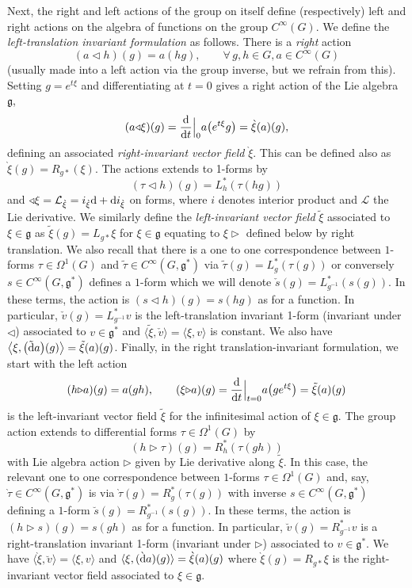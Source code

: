 \documentclass[pdftex]{sigma}
\numberwithin{equation}{section}
\newcommand{\<}{{\langle}}
\renewcommand{\>}{{\rangle}}
\newcommand{\CL}{{\mathcal{L}}}
\newcommand{\extd}{{\rm d}}
\newcommand{\la}{{\triangleright}}
\newcommand{\ra}{{\triangleleft}}
\newcommand{\cg}{{\mathfrak{g}}}
\newcommand{\tilder}{\grave}
\newcommand{\hatr}{\breve }
\newcommand{\hatl}{\check }
\begin{document}
Next, the right and left actions of the group on itself define (respectively) left and right actions on the algebra of functions on the group $C^\infty(G)$. We define the {\em left-translation invariant formulation} as follows. There is a {\em right} action
\[ (a\ra h)(g)=a(hg), \qquad\forall\, g,h\in G, a\in C^\infty(G) \]
(usually made into a left action via the group inverse, but we refrain from this). Setting $g=e^{t\xi}$ and differentiating at $t=0$ gives a right action of the Lie algebra $\cg$,
\[ (a\ra\xi)(g)=\frac{\extd}{\extd t}\Big|_0a\big(e^{t\xi}g\big)=\tilder\xi(a)(g), \]
defining an associated {\em right-invariant vector field} $\tilder\xi$. This can be defined also as $\tilder\xi(g)=R_{g*}(\xi)$. The actions extends to 1-forms by
\[ (\tau\ra h)(g)=L_h^*(\tau(hg))\]
and $\ra\xi=\CL_{\tilder\xi}=i_{\tilder\xi}\extd+\extd i_{\tilder\xi}$ on forms, where $i$ denotes interior product and $\CL$ the Lie derivative. We similarly define the {\em left-invariant vector field} $\tilde\xi$ associated to $\xi\in\cg$ as $\tilde\xi(g)=L_{g*}\xi$ for $\xi\in \cg$ equating to $\xi\la$ defined below by right translation. We also recall that there is a one to one correspondence between $1$-forms $\tau\in \Omega^1(G)$ and $\tilde{\tau}\in C^\infty(G,\mathfrak{g}^*)$ via $\tilde{\tau}(g)=L^*_{g}(\tau(g))$ or conversely $s\in C^\infty(G,\mathfrak{g}^*)$ defines a $1$-form which we will denote $\hatl{s}(g)=L^*_{g^{-1}}(s(g))$. In these terms, the action is $(s\ra h)(g)=s(hg)$ as for a function. In particular, $\hatl v(g)=L_{g^{-1}}^*v$ is the left-translation invariant 1-form (invariant under $\ra$) associated to $v\in\cg^*$ and $\<\tilde\xi,\hatl v\>=\<\xi,v\>$ is constant. We also have $\big\langle \xi,\big(\tilde\extd a\big)(g)\big\rangle=\tilde\xi(a)(g)$. Finally, in the right translation-invariant formulation, we start with the left action
\[ (h\la a)(g)=a(gh),\qquad (\xi\la a)(g)={\extd \over\extd t}\Big|_{t=0}a\big(ge^{t\xi}\big)=\tilde{\xi}(a)(g)\]
is the left-invariant vector field $\tilde\xi$ for the infinitesimal action of $\xi\in\cg$. The group action extends to differential forms $\tau\in \Omega^1(G)$ by
\[ (h\la\tau)(g)=R^*_{h}(\tau(gh))\]
with Lie algebra action $\la$ given by Lie derivative along $\tilde\xi$. In this case, the relevant one to one correspondence between $1$-forms $\tau\in \Omega^1(G)$ and, say, $\tilder{\tau}\in C^\infty(G,\mathfrak{g}^*)$ is via $\tilder{\tau}(g)=R^*_{g}(\tau(g))$ with inverse $s\in C^\infty(G,\mathfrak{g}^*)$ defining a $1$-form $\hatr{s}(g)=R^*_{g^{-1}}(s(g))$. In these terms, the action is $(h\la s)(g)=s(gh)$ as for a function. In particular, $\hatr v(g)=R_{g^{-1}}^*v$ is a right-translation invariant 1-form (invariant under $\la$) associated to $v\in\cg^*$. We have $\<\tilder\xi,\hatr v\>=\<\xi,v\>$ and $\<\xi,(\tilder\extd a)(g)\>=\tilder\xi(a)(g)$ where $\tilder\xi(g)=R_{g*}\xi$ is the right-invariant vector field associated to $\xi\in\cg$.
\end{document}
